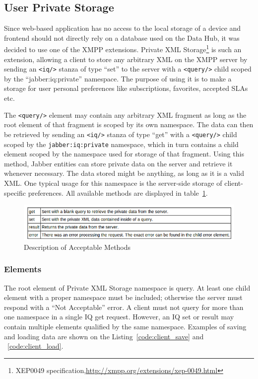 


\subsection{User Private Storage}
    \label{xep0049}
	Since web-based application has no access to the local storage of a device and frontend should not directly rely on a database used on the Data Hub, it was decided to use one of the XMPP extensions. Private XML Storage\footnote{XEP0049 specification,\url{http://xmpp.org/extensions/xep-0049.html}} is such an extension, allowing a client to store any arbitrary XML on the XMPP server by sending an \verb|<iq/>| stanza of type ``set'' to the server with a \verb|<query/>| child scoped by the ``jabber:iq:private'' namespace. The purpose of using it is to make a storage for user personal preferences like subscriptions, favorites, accepted SLAs etc.

    The \verb|<query/>| element may contain any arbitrary XML fragment as long as the root element of that fragment is scoped by its own namespace. The data can then be retrieved by sending an \verb|<iq/>| stanza of type ``get'' with a \verb|<query/>| child scoped by the \verb|jabber:iq:private| namespace, which in turn contains a child element scoped by the namespace used for storage of that fragment. Using this method, Jabber entities can store private data on the server and retrieve it whenever necessary. The data stored might be anything, as long as it is a valid XML. One typical usage for this namespace is the server-side storage of client-specific preferences. All available methods are displayed in table~\ref{img:xep49-methods}.
	
	\begin{figure}[!ht]
		\centering
		\includegraphics[scale=0.9]{images/xep0049Queries.png}   
		\caption[ Description of Acceptable Methods]{Description of Acceptable Methods}
		\label{img:xep49-methods}
		\end{figure}
	\subsubsection{Elements}
	The root element of Private XML Storage namespace is query. At least one child element with a proper namespace must be included; otherwise the server must respond with a ``Not Acceptable'' error. A client must not query for more than one namespace in a single IQ get request. However, an IQ set or result may contain multiple elements qualified by the same namespace. Examples of saving and loading data are shown on the Listing~\ref{code:client_save} and ~\ref{code:client_load}.

